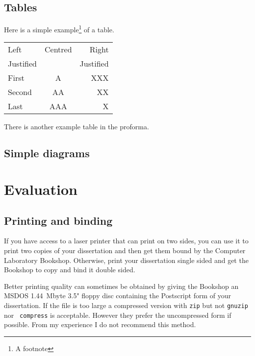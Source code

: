 \documentclass[12pt,twoside,notitlepage]{report}
\begin{document}
\section{Tables}

\begin{samepage}
Here is a simple example\footnote{A footnote} of a table.

\begin{center}
\begin{tabular}{l|c|r}
Left      & Centred & Right \\
Justified &         & Justified \\[3mm]
First     & A       & XXX \\
Second    & AA      & XX  \\
Last      & AAA     & X   \\
\end{tabular}
\end{center}

\noindent
There is another example table in the proforma.
\end{samepage}

\section{Simple diagrams}




\cleardoublepage

\chapter{Evaluation}

\section{Printing and binding}

If you have access to a laser printer that can print on two sides, you
can use it to print two copies of your dissertation and then get them
bound by the Computer Laboratory Bookshop. Otherwise, print your
dissertation single sided and get the Bookshop to copy and bind it double
sided.


Better printing quality can sometimes be obtained by giving the
Bookshop an MSDOS 1.44~Mbyte 3.5" floppy disc containing the
Postscript form of your dissertation. If the file is too large a
compressed version with {\tt zip} but not {\tt gnuzip} nor {\tt
compress} is acceptable. However they prefer the uncompressed form if
possible. From my experience I do not recommend this method.
\end{document}
